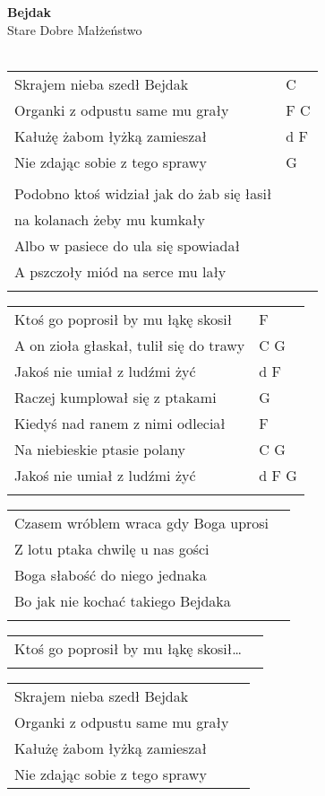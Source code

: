 \documentclass[a5paper]{article}
\begin{document}


\noindent
\fontsize{12pt}{15pt}\selectfont
\textbf{Bejdak} \\
\fontsize{8pt}{10pt}\selectfont
Stare Dobre Małżeństwo \\ \\
\fontsize{10pt}{12pt}\selectfont
{}
\begin{tabular}{@{}p{8.5cm}p{3cm}@{}}
\noindent
Skrajem nieba szedł Bejdak & C \\
Organki z odpustu same mu grały & F C \\
Kałużę żabom łyżką zamieszał & d F \\
Nie zdając sobie z tego sprawy & G \\ \\

Podobno ktoś widział jak do żab się łasił \\
na kolanach żeby mu kumkały \\
Albo w pasiece do ula się spowiadał \\
A pszczoły miód na serce mu lały \\ \\
\end{tabular}

\noindent
\begin{tabular}{@{}p{7.5cm}p{3cm}@{}}
Ktoś go poprosił by mu łąkę skosił & F \\
A on zioła głaskał, tulił się do trawy & C G \\
Jakoś nie umiał z ludźmi żyć & d F \\
Raczej kumplował się z ptakami & G \\
Kiedyś nad ranem z nimi odleciał & F \\
Na niebieskie ptasie polany & C G \\
Jakoś nie umiał z ludźmi żyć & d F G \\ \\
\end{tabular}

\noindent
\begin{tabular}{@{}p{8.5cm}p{3cm}@{}}
Czasem wróblem wraca gdy Boga uprosi\\
Z lotu ptaka chwilę u nas gości\\
Boga słabość do niego jednaka\\
Bo jak nie kochać takiego Bejdaka\\\\
\end{tabular}

\noindent
\begin{tabular}{@{}p{8.5cm}p{3cm}@{}}
Ktoś go poprosił by mu łąkę skosił…\\\\
\end{tabular}

\noindent
\begin{tabular}{@{}p{8.5cm}p{3cm}@{}}
Skrajem nieba szedł Bejdak \\
Organki z odpustu same mu grały\\ 
Kałużę żabom łyżką zamieszał \\
Nie zdając sobie z tego sprawy
\end{tabular}
\end{document}
